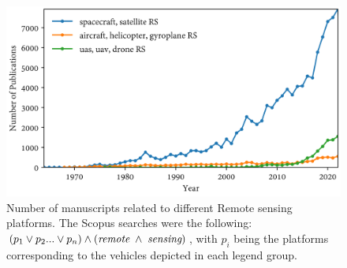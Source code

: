 \begin{figure}[!ht]
	\includegraphics[width=\linewidth]{figs/introduction/platform_timeline.png}
	\caption{Number of manuscripts related to different \gls{Remote sensing} platforms. The Scopus searches were the following: $(p_1 \lor p_2 ... \lor p_n) \land (\textit{remote} \hspace{1mm} \land \hspace{1mm} \textit{sensing})$, with $p_i$ being the platforms corresponding to the vehicles depicted in each legend group. }
    \label{fig:scopus_search_platforms}
\end{figure}

